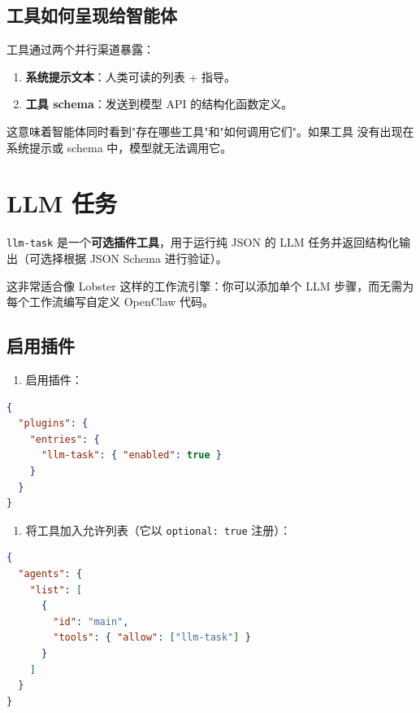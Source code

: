 \subsection{工具如何呈现给智能体}


工具通过两个并行渠道暴露：

\begin{enumerate}
  \item \textbf{系统提示文本}：人类可读的列表 + 指导。
  \item \textbf{工具 schema}：发送到模型 API 的结构化函数定义。
\end{enumerate}


这意味着智能体同时看到"存在哪些工具"和"如何调用它们"。如果工具
没有出现在系统提示或 schema 中，模型就无法调用它。


\clearpage

\section{LLM 任务}


\texttt{llm-task} 是一个\textbf{可选插件工具}，用于运行纯 JSON 的 LLM 任务并返回结构化输出（可选择根据 JSON Schema 进行验证）。

这非常适合像 Lobster 这样的工作流引擎：你可以添加单个 LLM 步骤，而无需为每个工作流编写自定义 OpenClaw 代码。

\subsection{启用插件}


\begin{enumerate}
  \item 启用插件：
\end{enumerate}


\begin{lstlisting}[language=json]
{
  "plugins": {
    "entries": {
      "llm-task": { "enabled": true }
    }
  }
}
\end{lstlisting}


\begin{enumerate}
  \item 将工具加入允许列表（它以 \texttt{optional: true} 注册）：
\end{enumerate}


\begin{lstlisting}[language=json]
{
  "agents": {
    "list": [
      {
        "id": "main",
        "tools": { "allow": ["llm-task"] }
      }
    ]
  }
}
\end{lstlisting}


